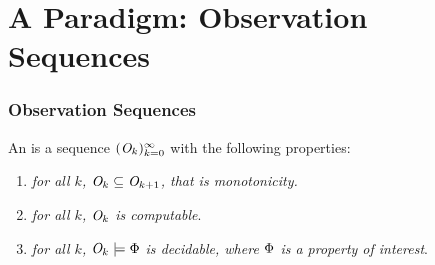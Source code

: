 \documentclass[aspectratio=169]{beamer}
\begin{document}
\section{A Paradigm: Observation Sequences}
\begin{frame}
  \frametitle{Observation Sequences}
  \begin{definition}
    \vskip4pt
    \label{definition: observation sequence}
    An  is a sequence $\OS$ with the following
    properties:
    \begin{enumerate}[$\bullet$]
    \item%
      \emph{for all $k$, $\observation_k \subseteq \observation_{k+1}$, that is \alert{monotonicity}.} 

    \item%
      \emph{for all $k$, $\observation_k$ is \alert{computable}}. 

    \item%
      \emph{for all $k$, $\observation[k] \models \property$ is \alert{decidable}, where $\Phi$ is a property of interest}.
    \end{enumerate}
  \end{definition}
\end{frame}
\end{document}
